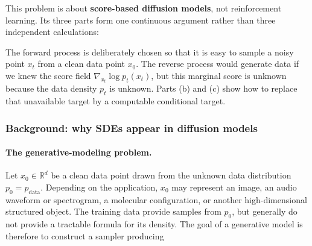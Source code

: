 \documentclass[11pt,a4paper]{article}
\theoremstyle{definition}
\begin{document}
This problem is about \textbf{score-based diffusion models}, not reinforcement learning. Its three parts form one continuous argument rather than three independent calculations:

\begin{center}
\end{center}

The forward process is deliberately chosen so that it is easy to sample a noisy point $x_t$ from a clean data point $x_0$. The reverse process would generate data if we knew the score field $\nabla_{x_t}\log p_t(x_t)$, but this marginal score is unknown because the data density $p_t$ is unknown. Parts (b) and (c) show how to replace that unavailable target by a computable conditional target.

\subsubsection{Background: why SDEs appear in diffusion models}

\paragraph{The generative-modeling problem.}
Let $x_0\in\mathbb{R}^d$ be a clean data point drawn from the unknown data distribution
$p_0=p_{\mathrm{data}}$. Depending on the application, $x_0$ may represent an image,
an audio waveform or spectrogram, a molecular configuration, or another high-dimensional
structured object. The training data provide samples from $p_0$, but generally do not
provide a tractable formula for its density. The goal of a generative model is therefore
to construct a sampler producing
\end{document}
